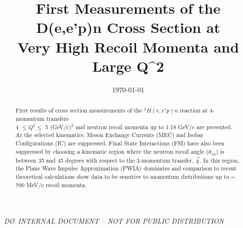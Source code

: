\documentclass[aps,prl,twocolumn,showpacs,superscriptaddress,groupedaddress]{revtex4-1}  %
\begin{document}
\widetext
{}
\centerline{\em D\O\ INTERNAL DOCUMENT -- NOT FOR PUBLIC DISTRIBUTION}


\title{First Measurements of the D(e,e'p)n Cross Section at \\ Very High Recoil Momenta and Large Q^{2}}
\date{\today}


\begin{abstract}
  First results of cross section measurements of the $^{2}H(e,e'p)n$ reaction at 4-momentum transfers \\ 4 $\leq Q^{2}\leq$ 5 (GeV/c)$^{2}$  and
  neutron recoil momenta up to 1.18 GeV/c are presented. At the selected kinematics, Meson Exchange Currents (MEC) and Isobar
  Configurations (IC) are suppressed. Final State Interactions (FSI) have also been suppressed by choosing a kinematic region where the neutron recoil
  angle ($\theta_{nq}$) is between 35 and 45 degrees with respect to the 3-momentum transfer, $\vec{q}$. In this region, the Plane Wave Impulse Approximation (PWIA) dominates and comparison
  to recent theoretical calculations show data to be sensitive to momentum distributions up to $\sim$ 700 MeV/c recoil momenta.
  
  
  
\end{abstract}
\end{document}
